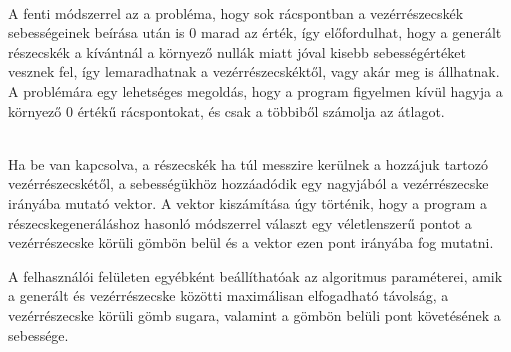 \begin{description}
\setlength{\parindent}{2ex}
\item [A 0 sebességértékek figyelmen kívül hagyása:] \hfill \\
A fenti módszerrel az a probléma, 
hogy sok rácspontban a vezérrészecskék 
sebességeinek beírása után is 0 marad az érték, 
így előfordulhat, 
hogy a generált részecskék a kívántnál a környező nullák miatt 
jóval kisebb sebességértéket vesznek fel, 
így lemaradhatnak a vezérrészecskéktől, 
vagy akár meg is állhatnak. 
A problémára egy lehetséges megoldás, 
hogy a program figyelmen kívül hagyja a környező 0 értékű rácspontokat, 
és csak a többiből számolja az átlagot.
\item [A vezérrészecskék követése:] \hfill \\
Ha be van kapcsolva, 
a részecskék ha túl messzire kerülnek 
a hozzájuk tartozó vezérrészecskétől, 
a sebességükhöz hozzáadódik egy nagyjából 
a vezérrészecske irányába mutató vektor.
A vektor kiszámítása úgy történik,
hogy a program a részecskegeneráláshoz hasonló módszerrel 
választ egy véletlenszerű pontot a vezérrészecske körüli gömbön belül 
és a vektor ezen pont irányába fog mutatni.

A felhasználói felületen egyébként 
beállíthatóak az algoritmus paraméterei, 
amik a generált és vezérrészecske közötti maximálisan elfogadható távolság, 
a vezérrészecske körüli gömb sugara, 
valamint a gömbön belüli pont követésének a sebessége.
\end{description}
